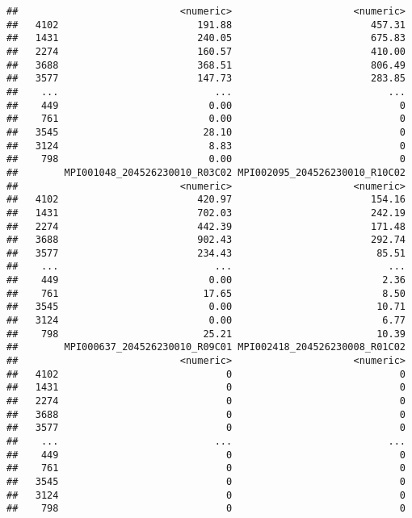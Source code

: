 \documentclass[
]{article}
\begin{document}
\begin{verbatim}
##                            <numeric>                     <numeric>
##   4102                        191.88                        457.31
##   1431                        240.05                        675.83
##   2274                        160.57                        410.00
##   3688                        368.51                        806.49
##   3577                        147.73                        283.85
##    ...                           ...                           ...
##    449                          0.00                             0
##    761                          0.00                             0
##   3545                         28.10                             0
##   3124                          8.83                             0
##    798                          0.00                             0
##        MPI001048_204526230010_R03C02 MPI002095_204526230010_R10C02
##                            <numeric>                     <numeric>
##   4102                        420.97                        154.16
##   1431                        702.03                        242.19
##   2274                        442.39                        171.48
##   3688                        902.43                        292.74
##   3577                        234.43                         85.51
##    ...                           ...                           ...
##    449                          0.00                          2.36
##    761                         17.65                          8.50
##   3545                          0.00                         10.71
##   3124                          0.00                          6.77
##    798                         25.21                         10.39
##        MPI000637_204526230010_R09C01 MPI002418_204526230008_R01C02
##                            <numeric>                     <numeric>
##   4102                             0                             0
##   1431                             0                             0
##   2274                             0                             0
##   3688                             0                             0
##   3577                             0                             0
##    ...                           ...                           ...
##    449                             0                             0
##    761                             0                             0
##   3545                             0                             0
##   3124                             0                             0
##    798                             0                             0

\end{verbatim}
\end{document}
